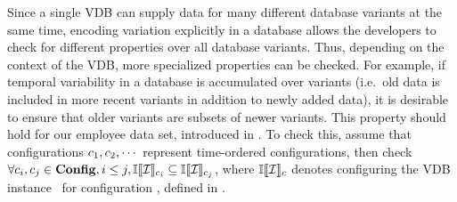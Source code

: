 \noindent
%
%
 Since a single VDB can supply data for many different database variants at the
 same time, encoding variation explicitly in a database allows the developers
 to check for different properties over all database variants.
%
Thus, depending on the context of the VDB, more specialized properties can be checked.
For example, if temporal variability in a database is accumulated over
variants (i.e.\ old data is included in more recent variants in addition to
newly added data), it is desirable to ensure that older variants are subsets of
newer variants.
%
This property should hold for our employee data set, introduced in 
. To check this, 
assume that configurations \ensuremath{\config_1, \config_2, \cdots}
represent time-ordered configurations, then check
\ensuremath{
\forall \config_i, \config_j \in \confSet, i \le j, \odbSem [\config_i] {\vdbInst} \subseteq \odbSem [\config_j]{\vdbInst}
}, 
where \ensuremath{\odbSem[\config]{\vdbInst}} denotes configuring the VDB instance
\vdbInst\ for configuration \config, defined in .



